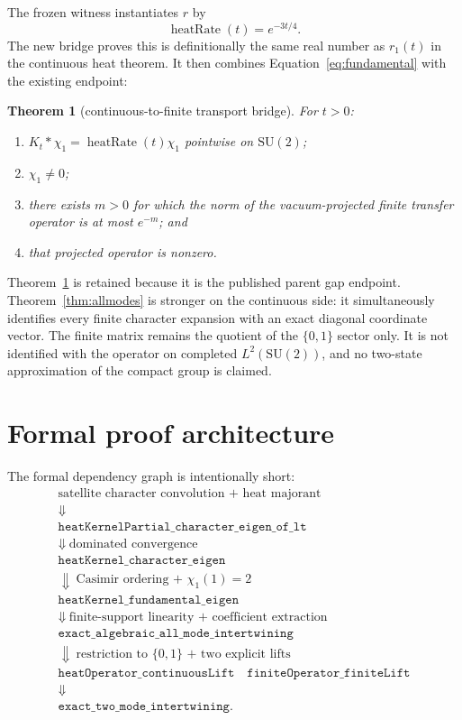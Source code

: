 \documentclass[11pt]{article}
\newtheorem{theorem}{Theorem}[section]
\theoremstyle{definition}
\theoremstyle{remark}
\newcommand{\SU}{\mathrm{SU}(2)}
\begin{document}
The frozen witness instantiates $r$ by
\[
  \operatorname{heatRate}(t)=e^{-3t/4}.
\]
The new bridge proves this is definitionally the same real number as $r_1(t)$
in the continuous heat theorem.  It then combines
Equation~\eqref{eq:fundamental} with the existing endpoint:

\begin{theorem}[continuous-to-finite transport bridge]\label{thm:bridge}
For $t>0$:
\begin{enumerate}[label=(\alph*)]
\item $K_t*\chi_1=\operatorname{heatRate}(t)\chi_1$ pointwise on $\SU$;
\item $\chi_1\ne0$;
\item there exists $m>0$ for which the norm of the vacuum-projected finite
transfer operator is at most $e^{-m}$; and
\item that projected operator is nonzero.
\end{enumerate}
\end{theorem}

Theorem~\ref{thm:bridge} is retained because it is the published parent gap
endpoint.  Theorem~\ref{thm:allmodes} is stronger on the continuous side: it
simultaneously identifies every finite character expansion with an exact
diagonal coordinate vector.  The finite matrix remains the quotient of the
$\{0,1\}$ sector only.  It is not identified with the operator on completed
$L^2(\SU)$, and no two-state approximation of the compact group is claimed.

\section{Formal proof architecture}

The formal dependency graph is intentionally short:
\[
\begin{array}{c}
\text{satellite character convolution + heat majorant}\\
\Downarrow\\
\texttt{heatKernelPartial\_character\_eigen\_of\_lt}\\
\Downarrow\ \text{dominated convergence}\\
\texttt{heatKernel\_character\_eigen}\\
\Downarrow\ \text{Casimir ordering + }\chi_1(1)=2\\
\texttt{heatKernel\_fundamental\_eigen}\\
\Downarrow\ \text{finite-support linearity + coefficient extraction}\\
\texttt{exact\_algebraic\_all\_mode\_intertwining}\\
\Downarrow\ \text{restriction to }\{0,1\}\text{ + two explicit lifts}\\
\texttt{heatOperator\_continuousLift}\quad
\texttt{finiteOperator\_finiteLift}\\
\Downarrow\\
\texttt{exact\_two\_mode\_intertwining}.
\end{array}
\]
\end{document}
